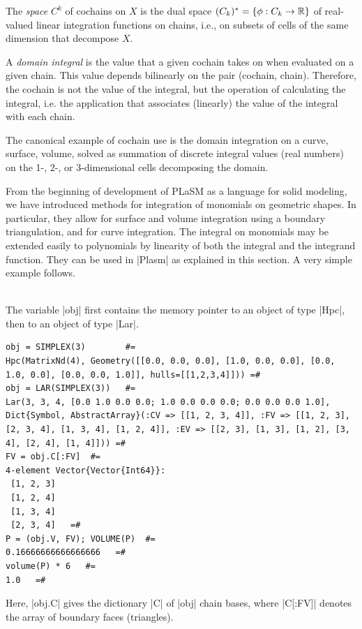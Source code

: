 {\begin{remark}
\begin{end}
The \emph{space} $C^k$ of cochains on $X$ is the dual space $(C_k)^* = \{\phi : C_k \to \mathbb{R}\}$ of real-valued linear integration functions on chains, i.e., on subsets of cells of the same dimension that decompose $X$.  

A \emph{domain integral} is the value that a given cochain takes on when evaluated on a given chain. This value depends bilinearly on the pair (cochain, chain). Therefore, the cochain is not the value of the integral, but the operation of calculating the integral, i.e. the application that associates (linearly) the value of the integral with each chain.

The canonical example of cochain use is the domain integration on a curve, surface, volume, solved as summation of discrete integral values (real numbers) on the 1-, 2-, or 3-dimensional cells decomposing the domain.

From the beginning of development of PLaSM as a language for solid modeling, we have introduced methods for integration of monomials on geometric shapes. In particular, they allow for surface and volume integration using a boundary triangulation, and for curve integration.  The integral on monomials may be extended easily to polynomials by linearity of both the integral and the integrand function. They can be used in |Plasm| as explained in this section. A very simple example follows.


\begin{coding}\\
The variable |obj| first contains the memory pointer to an object of type |Hpc|, then to an object of type |Lar|. 
\begin{lstlisting}[language=JuliaLocal, style=julia, mathescape = true]
obj = SIMPLEX(3) 		#=
Hpc(MatrixNd(4), Geometry([[0.0, 0.0, 0.0], [1.0, 0.0, 0.0], [0.0, 1.0, 0.0], [0.0, 0.0, 1.0]], hulls=[[1,2,3,4]])) =#		
obj = LAR(SIMPLEX(3)) 	#=
Lar(3, 3, 4, [0.0 1.0 0.0 0.0; 1.0 0.0 0.0 0.0; 0.0 0.0 0.0 1.0], Dict{Symbol, AbstractArray}(:CV => [[1, 2, 3, 4]], :FV => [[1, 2, 3], [2, 3, 4], [1, 3, 4], [1, 2, 4]], :EV => [[2, 3], [1, 3], [1, 2], [3, 4], [2, 4], [1, 4]])) =#	
FV = obj.C[:FV]  #=
4-element Vector{Vector{Int64}}:
 [1, 2, 3]
 [1, 2, 4]
 [1, 3, 4]
 [2, 3, 4]   =#
P = (obj.V, FV); VOLUME(P)  #=
0.16666666666666666   =#
volume(P) * 6   #=
1.0   =#
\end{lstlisting}
Here, |obj.C| gives the dictionary |C| of |obj| chain bases, where |C[:FV]| denotes the array of boundary faces (triangles).
\end{coding}


\end{end}
\end{remark}}

